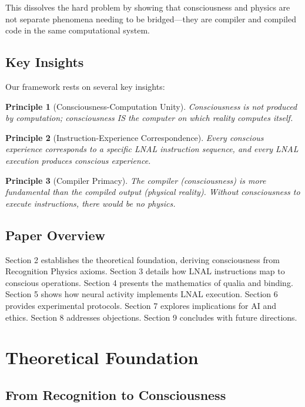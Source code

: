 \documentclass[12pt,a4paper]{article}
\newtheorem{principle}{Principle}[section]
\begin{document}
This dissolves the hard problem by showing that consciousness and physics are not separate phenomena needing to be bridged—they are compiler and compiled code in the same computational system.

\subsection{Key Insights}

Our framework rests on several key insights:

\begin{principle}[Consciousness-Computation Unity]
Consciousness is not produced by computation; consciousness IS the computer on which reality computes itself.
\end{principle}

\begin{principle}[Instruction-Experience Correspondence]
Every conscious experience corresponds to a specific LNAL instruction sequence, and every LNAL execution produces conscious experience.
\end{principle}

\begin{principle}[Compiler Primacy]
The compiler (consciousness) is more fundamental than the compiled output (physical reality). Without consciousness to execute instructions, there would be no physics.
\end{principle}

\subsection{Paper Overview}

Section 2 establishes the theoretical foundation, deriving consciousness from Recognition Physics axioms. Section 3 details how LNAL instructions map to conscious operations. Section 4 presents the mathematics of qualia and binding. Section 5 shows how neural activity implements LNAL execution. Section 6 provides experimental protocols. Section 7 explores implications for AI and ethics. Section 8 addresses objections. Section 9 concludes with future directions.

\section{Theoretical Foundation}

\subsection{From Recognition to Consciousness}
\end{document}
